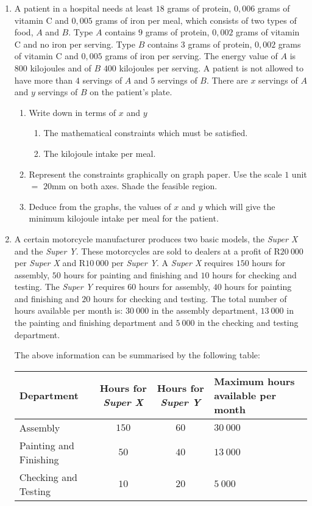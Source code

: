 \begin{eocexercises}{}
\begin{enumerate}
\item{A patient in a hospital needs at least $18$ grams of protein, $0,006$ grams of vitamin C and $0,005$ grams of iron per meal, which consists of two types of food, $A$ and $B$. Type $A$ contains $9$ grams of protein, $0,002$ grams of vitamin C and no iron per serving. Type $B$ contains $3$ grams of protein, $0,002$ grams of vitamin C and $0,005$ grams of iron per serving. The energy value of $A$ is $800$ kilojoules and of $B$ $400$ kilojoules per serving. A patient is not allowed to have more than $4$ servings of $A$ and $5$ servings of $B$. There are $x$ servings of $A$ and $y$ servings of $B$ on the patient's plate.
\begin{enumerate}
\item{Write down in terms of $x$ and $y$}
\begin{enumerate}
\item{The mathematical constraints which must be satisfied.}
\item{The kilojoule intake per meal.}
\end{enumerate}
\item{Represent the constraints graphically on graph paper. Use the scale $1$ unit $=$ $20$mm on both axes. Shade the feasible region.}
\item{Deduce from the graphs, the values of $x$ and $y$ which will give the minimum kilojoule intake per meal for the patient.}
\end{enumerate}}
\item{A certain motorcycle manufacturer produces two basic models, the \textit{Super X} and the \textit{Super Y}. These motorcycles are sold to dealers at a profit of R$20~000$ per \textit{Super X} and R$10~000$ per \textit{Super Y}. A \textit{Super X} requires $150$ hours for assembly, $50$ hours for painting and finishing and $10$ hours for checking and testing. The \textit{Super Y} requires $60$ hours for assembly, $40$ hours for painting and finishing and $20$ hours for checking and testing. The total number of hours available per month is: $30~000$ in the assembly department, $13~000$ in the painting and finishing department and $5~000$ in the checking and testing department.

The above information can be summarised by the following table:

\begin{center}
\begin{tabular}{|l|c|c|p{3cm}|}\hline
Department& Hours for \textit{Super X}&Hours for \textit{Super Y}& Maximum hours available per month\\\hline\hline
Assembly&$150$&$60$&$30~ 000$\\\hline
Painting and Finishing & $50$& $40$ &$13~ 000$\\\hline
Checking and Testing &$10$&$20$&$5~ 000$\\\hline
\end{tabular}
\end{center}

}
\end{enumerate}
\end{eocexercises}
